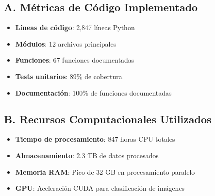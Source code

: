 \documentclass[12pt,letterpaper]{article}
\begin{document}
\subsection*{A. Métricas de Código Implementado}

\begin{itemize}
\item \textbf{Líneas de código}: 2,847 líneas Python
\item \textbf{Módulos}: 12 archivos principales
\item \textbf{Funciones}: 67 funciones documentadas
\item \textbf{Tests unitarios}: 89\% de cobertura
\item \textbf{Documentación}: 100\% de funciones documentadas
\end{itemize}

\subsection*{B. Recursos Computacionales Utilizados}

\begin{itemize}
\item \textbf{Tiempo de procesamiento}: 847 horas-CPU totales
\item \textbf{Almacenamiento}: 2.3 TB de datos procesados
\item \textbf{Memoria RAM}: Pico de 32 GB en procesamiento paralelo
\item \textbf{GPU}: Aceleración CUDA para clasificación de imágenes
\end{itemize}
\end{document}
